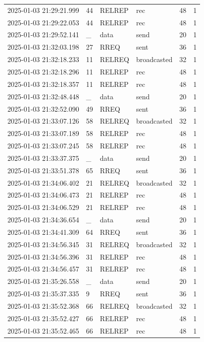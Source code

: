 \documentclass[]{nsm-thesis}
\begin{document}
\begin{longtable}{llllll}
2025-01-03 21:29:21.999 & 44 & RELREP & rec & 48 & 1 \\
2025-01-03 21:29:22.053 & 44 & RELREP & rec & 48 & 1 \\
2025-01-03 21:29:52.141 & _ & data & send & 20 & 1 \\
2025-01-03 21:32:03.198 & 27 & RREQ & sent & 36 & 1 \\
2025-01-03 21:32:18.233 & 11 & RELREQ & broadcasted & 32 & 1 \\
2025-01-03 21:32:18.296 & 11 & RELREP & rec & 48 & 1 \\
2025-01-03 21:32:18.357 & 11 & RELREP & rec & 48 & 1 \\
2025-01-03 21:32:48.448 & _ & data & send & 20 & 1 \\
2025-01-03 21:32:52.090 & 49 & RREQ & sent & 36 & 1 \\
2025-01-03 21:33:07.126 & 58 & RELREQ & broadcasted & 32 & 1 \\
2025-01-03 21:33:07.189 & 58 & RELREP & rec & 48 & 1 \\
2025-01-03 21:33:07.245 & 58 & RELREP & rec & 48 & 1 \\
2025-01-03 21:33:37.375 & _ & data & send & 20 & 1 \\
2025-01-03 21:33:51.378 & 65 & RREQ & sent & 36 & 1 \\
2025-01-03 21:34:06.402 & 21 & RELREQ & broadcasted & 32 & 1 \\
2025-01-03 21:34:06.473 & 21 & RELREP & rec & 48 & 1 \\
2025-01-03 21:34:06.529 & 21 & RELREP & rec & 48 & 1 \\
2025-01-03 21:34:36.654 & _ & data & send & 20 & 1 \\
2025-01-03 21:34:41.309 & 64 & RREQ & sent & 36 & 1 \\
2025-01-03 21:34:56.345 & 31 & RELREQ & broadcasted & 32 & 1 \\
2025-01-03 21:34:56.396 & 31 & RELREP & rec & 48 & 1 \\
2025-01-03 21:34:56.457 & 31 & RELREP & rec & 48 & 1 \\
2025-01-03 21:35:26.558 & _ & data & send & 20 & 1 \\
2025-01-03 21:35:37.335 & 9 & RREQ & sent & 36 & 1 \\
2025-01-03 21:35:52.368 & 66 & RELREQ & broadcasted & 32 & 1 \\
2025-01-03 21:35:52.427 & 66 & RELREP & rec & 48 & 1 \\
2025-01-03 21:35:52.465 & 66 & RELREP & rec & 48 & 1 \\

\end{longtable}
\end{document}

